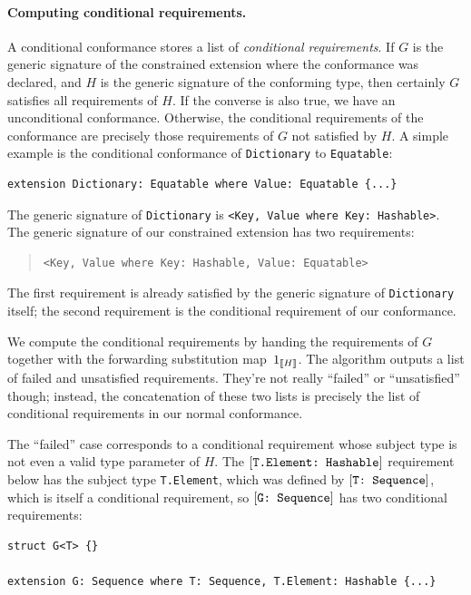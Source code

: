 \documentclass[../generics]{subfiles}
\begin{document}
\paragraph{Computing conditional requirements.}
A conditional conformance stores a list of \emph{conditional requirements}. If $G$ is the generic signature of the constrained extension where the conformance was declared, and $H$ is the generic signature of the conforming type, then certainly $G$ satisfies all requirements of $H$. If the converse is also true, we have an unconditional conformance. Otherwise, the conditional requirements of the conformance are precisely those requirements of $G$ not satisfied by $H$. A simple example is the conditional conformance of \texttt{Dictionary} to \texttt{Equatable}:
\begin{Verbatim}
extension Dictionary: Equatable where Value: Equatable {...}
\end{Verbatim}
The generic signature of \texttt{Dictionary} is \verb|<Key, Value where Key: Hashable>|. The generic signature of our constrained extension has two requirements:
\begin{quote}
\begin{verbatim}
<Key, Value where Key: Hashable, Value: Equatable>
\end{verbatim}
\end{quote}
The first requirement is already satisfied by the generic signature of \texttt{Dictionary} itself; the second requirement is the conditional requirement of our conformance.

We compute the conditional requirements by handing  the requirements of $G$ together with the forwarding substitution map~$1_{[\![H]\!]}$. The algorithm outputs a list of failed and unsatisfied requirements. They're not really ``failed'' or ``unsatisfied'' though; instead, the concatenation of these two lists is precisely the list of conditional requirements in our normal conformance.

The ``failed'' case corresponds to a conditional requirement whose subject type is not even a valid type parameter of $H$. The $[\texttt{T.Element:~Hashable}]$ requirement below has the subject type \texttt{T.Element}, which was defined by $[\texttt{T:~Sequence}]$, which is itself a conditional requirement, so $[\texttt{G:~Sequence}]$ has two conditional requirements:
\begin{Verbatim}
struct G<T> {}

extension G: Sequence where T: Sequence, T.Element: Hashable {...}
\end{Verbatim}
\end{document}
